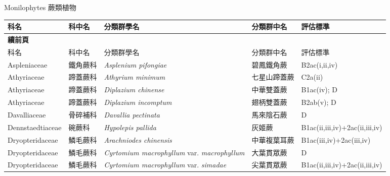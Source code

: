 \noindent\normalfont\selectfont Monilophytes 蕨類植物
\footnotesize\selectfont
        {\def\arraystretch{1.5}\tabcolsep=2pt
        \begin{longtable}{p{2.5cm}p{2.5cm}p{4.5cm}p{2.5cm}p{3cm}}
        \toprule
          科名 & 科中名 & 分類群學名 & 分類群中名 & 評估標準 \\
        \midrule 
        \endfirsthead

        {{\bfseries 續前頁 }} \\
        科名 & 科中名 & 分類群學名 & 分類群中名 & 評估標準 \\
        \midrule
        \endhead
                Aspleniaceae & 鐵角蕨科 & \textit{Asplenium pifongiae}  & 碧鳳鐵角蕨 & B2ac(i,ii,iv) \index{Asplenium@\textit{Asplenium}!pifongiae@\textit{pifongiae}}  \index{碧鳳鐵角蕨} \\
    Athyriaceae & 蹄蓋蕨科 & \textit{Athyrium minimum}  & 七星山蹄蓋蕨 & C2a(ii) \index{Athyrium@\textit{Athyrium}!minimum@\textit{minimum}}  \index{七星山蹄蓋蕨} \\
    Athyriaceae & 蹄蓋蕨科 & \textit{Diplazium chinense}  & 中華雙蓋蕨 & B1ac(iv); D \index{Diplazium@\textit{Diplazium}!chinense@\textit{chinense}}  \index{中華雙蓋蕨} \\
    Athyriaceae & 蹄蓋蕨科 & \textit{Diplazium incomptum}  & 翅柄雙蓋蕨 & B2ab(v); D \index{Diplazium@\textit{Diplazium}!incomptum@\textit{incomptum}}  \index{翅柄雙蓋蕨} \\
    Davalliaceae & 骨碎補科 & \textit{Davallia pectinata}  & 馬來陰石蕨 & D \index{Davallia@\textit{Davallia}!pectinata@\textit{pectinata}}  \index{馬來陰石蕨} \\
    Dennstaedtiaceae & 碗蕨科 & \textit{Hypolepis pallida}  & 灰姬蕨 & B1ac(ii,iii,iv)+2ac(ii,iii,iv) \index{Hypolepis@\textit{Hypolepis}!pallida@\textit{pallida}}  \index{灰姬蕨} \\
    Dryopteridaceae & 鱗毛蕨科 & \textit{Arachniodes chinensis}  & 中華複葉耳蕨 & B1ac(iii,iv)+2ac(iii,iv) \index{Arachniodes@\textit{Arachniodes}!chinensis@\textit{chinensis}}  \index{中華複葉耳蕨} \\
    Dryopteridaceae & 鱗毛蕨科 & \textit{Cyrtomium macrophyllum} var. \textit{macrophyllum}  & 大葉貫眾蕨 & D \index{Cyrtomium@\textit{Cyrtomium}!macrophyllum@\textit{macrophyllum}!var. macrophyllum@var. \textit{macrophyllum}}  \index{大葉貫眾蕨} \\
    Dryopteridaceae & 鱗毛蕨科 & \textit{Cyrtomium macrophyllum} var. \textit{simadae}  & 尖葉貫眾蕨 & B1ac(ii,iii,iv)+2ac(ii,iii,iv) \index{Cyrtomium@\textit{Cyrtomium}!macrophyllum@\textit{macrophyllum}!var. simadae@var. \textit{simadae}}  \index{尖葉貫眾蕨} \\

\end{longtable}}
